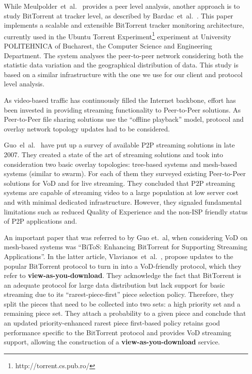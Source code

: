 While Meulpolder~et~al.~\cite{p2p09} provides a peer level analysis, another
approach is to study BitTorrent at tracker level, as described by
Bardac~et~al.~\cite{tracker-mon}.  This paper implements a scalable and
extensible BitTorrent tracker monitoring architecture, currently used in the
Ubuntu Torrent Experiment\footnote{http://torrent.cs.pub.ro/} experiment at
University POLITEHNICA of Bucharest, the Computer Science and Engineering
Department. The system analyses the peer-to-peer network considering both the
statistic data variation and the geographical distribution of data. This study
is based on a similar infrastructure with the one we use for our client and
protocol level analysis.

As video-based traffic has continuously filled the Internet backbone, effort
has been invested in providing streaming functionality to Peer-to-Peer
solutions.  As Peer-to-Peer file sharing solutions use the ``offline
playback'' model, protocol and overlay network topology updates had to be
considered.

Guo~el~al.~\cite{p2p-streaming-survey} have put up a survey of available P2P
streaming solutions in late 2007. They created a state of the art of streaming
solutions and took into consideration two basic overlay topologies: tree-based
systems and mesh-based systems (similar to swarm). For each of them they
surveyed existing Peer-to-Peer solutions for VoD and for live streaming. They
concluded that P2P streaming systems are capable of streaming video to a large
population at low server cost and with minimal dedicated infrastructure.
However, they signaled fundamental limitations such as reduced Quality of
Experience and the non-ISP friendly status of P2P applications and.

An important paper that was referred to by Guo et.~al, when considering VoD on
mesh-based systems was ``BiToS: Enhancing BitTorrent for Supporting Streaming
Applications''. In the latter article, Vlavianos~et~al.~\cite{bitos}, propose
updates to the popular BitTorrent protocol to turn in into a VoD-friendly
protocol, which they refer to \textbf{view-as-you-download}. They acknowledge
the fact that BitTorrent is an adequate protocol for large data distribution
but lack support for basic streaming due to its ``rarest-piece-first'' piece
selection policy. Therefore, they split the pieces that need to be collected
into two sets: a high priority set and a remaining piece set. They attach a
probability to a given piece and conclude that an updated priority-enhanced
rarest piece first-based policy retains good performance specific to the
BitTorrent protocol and provides VoD streaming support, allowing the
construction of a \textbf{view-as-you-download} service.

